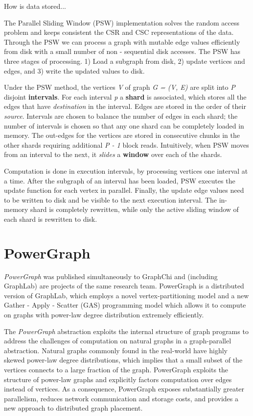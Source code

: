\documentclass[letterpaper,twocolumn,10pt]{article}
\begin{document}
How is data stored...

The Parallel Sliding Window (PSW) implementation solves the random access problem and keeps consistent the CSR and CSC representations of the data. Through the PSW	we can process a graph with mutable edge values efficiently from disk with a small number of non - sequential disk accesses. The PSW has three stages of processing. 1) Load a subgraph from disk, 2) update vertices and edges, and 3) write the updated values to disk.

Under the PSW method, the vertices \textit{V} of graph \textit{G =  (V, E)} are split into \textit{P} disjoint \textbf{intervals}. For each interval \textit{p} a \textbf{shard} is associated, which stores all the edges that have \textit{destination} in the interval. Edges are stored in the order of their \textit{source}. Intervals are chosen to balance the number of edges in each shard; the number of intervals is chosen so that any one shard can be completely loaded in memory.
The out-edges for the vertices are stored in consecutive chunks in the other shards requiring additional \textit{P - 1} block reads. 
Intuitively, when PSW moves from an interval to the next, it \textit{slides} a \textbf{window} over each of the shards.

Computation is done in execution intervals, by processing vertices one interval at a time. After the subgraph of an interval has been loaded, PSW executes the update function for each vertex in parallel.  
Finally, the update edge values need to be written to disk and be visible to the next execution interval. The in-memory shard is completely rewritten, while only the active sliding window of each shard is rewritten to disk. 

\section{PowerGraph}
\textit{PowerGraph} was published simultaneously to GraphChi and (including GraphLab) are projects of the same research team. PowerGraph is a distributed version of GraphLab, which employs a novel vertex-partitioning model and a new Gather - Apply - Scatter (GAS) programming model which allows it to compute on graphs with power-law degree distribution extremely efficiently.

The \textit{PowerGraph} abstraction exploits the internal structure of graph programs to address the challenges of computation on natural graphs in a graph-parallel abstraction. 
Natural graphs commonly found in the real-world have highly skewed power-law degree distributions, which implies that a small subset of the vertices connects to a large fraction of the graph. 
PowerGraph exploits the structure of power-law graphs and explicitly factors computation over edges instead of vertices. As a consequence, PowerGraph exposes substantially greater parallelism, reduces network communication and storage costs, and provides a new approach to distributed graph placement.
\end{document}
